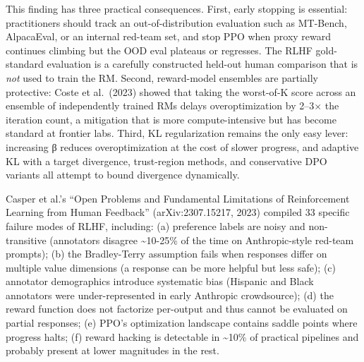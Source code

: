 \documentclass{article}
\begin{document}
This finding has three practical consequences. First, early stopping is essential: practitioners should track an out-of-distribution evaluation such as MT-Bench, AlpacaEval, or an internal red-team set, and stop PPO when proxy reward continues climbing but the OOD eval plateaus or regresses. The RLHF gold-standard evaluation is a carefully constructed held-out human comparison that is \emph{not} used to train the RM. Second, reward-model ensembles are partially protective: Coste et al.~(2023) showed that taking the worst-of-K score across an ensemble of independently trained RMs delays overoptimization by 2--3× the iteration count, a mitigation that is more compute-intensive but has become standard at frontier labs. Third, KL regularization remains the only easy lever: increasing β reduces overoptimization at the cost of slower progress, and adaptive KL with a target divergence, trust-region methods, and conservative DPO variants all attempt to bound divergence dynamically.

Casper et al.'s ``Open Problems and Fundamental Limitations of Reinforcement Learning from Human Feedback'' (arXiv:2307.15217, 2023) compiled 33 specific failure modes of RLHF, including: (a) preference labels are noisy and non-transitive (annotators disagree \textasciitilde10-25\% of the time on Anthropic-style red-team prompts); (b) the Bradley-Terry assumption fails when responses differ on multiple value dimensions (a response can be more helpful but less safe); (c) annotator demographics introduce systematic bias (Hispanic and Black annotators were under-represented in early Anthropic crowdsource); (d) the reward function does not factorize per-output and thus cannot be evaluated on partial responses; (e) PPO's optimization landscape contains saddle points where progress halts; (f) reward hacking is detectable in \textasciitilde10\% of practical pipelines and probably present at lower magnitudes in the rest.
\end{document}

